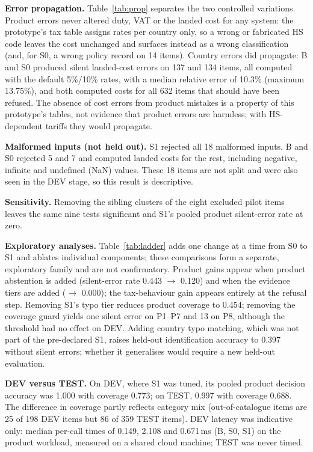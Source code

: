 \documentclass[conference]{IEEEtran}
\begin{document}
\textbf{Error propagation.} Table~\ref{tab:prop} separates the two controlled variations. Product errors never altered
duty, VAT or the landed cost for any system: the prototype's tax table assigns rates per country only, so a wrong or
fabricated HS code leaves the cost unchanged and surfaces instead as a wrong classification (and, for S0, a wrong
policy record on 14 items). Country errors did propagate: B and S0 produced silent landed-cost errors on 137 and 134
items, all computed with the default 5\%/10\% rates, with a median relative error of 10.3\% (maximum 13.75\%), and both
computed costs for all 632 items that should have been refused. The absence of cost errors from product mistakes is a
property of this prototype's tables, not evidence that product errors are harmless; with HS-dependent tariffs they
would propagate.



\textbf{Malformed inputs (not held out).} S1 rejected all 18 malformed inputs. B and S0 rejected 5 and 7 and computed
landed costs for the rest, including negative, infinite and undefined (NaN) values. These 18 items are not split and
were also seen in the DEV stage, so this result is descriptive.

\textbf{Sensitivity.} Removing the sibling clusters of the eight excluded pilot items leaves the same nine tests
significant and S1's pooled product silent-error rate at zero.

\textbf{Exploratory analyses.} Table~\ref{tab:ladder} adds one change at a time from S0 to S1 and ablates individual
components; these comparisons form a separate, exploratory family and are not confirmatory. Product gains appear when
product abstention is added (silent-error rate 0.443 $\rightarrow$ 0.120) and when the evidence tiers are added
($\rightarrow$ 0.000); the tax-behaviour gain appears entirely at the refusal step. Removing S1's typo tier reduces
product coverage to 0.454; removing the coverage guard yields one silent error on P1--P7 and 13 on P8, although the
threshold had no effect on DEV. Adding country typo matching, which was not part of the pre-declared S1, raises held-out
identification accuracy to 0.397 without silent errors; whether it generalises would require a new held-out evaluation.



\textbf{DEV versus TEST.} On DEV, where S1 was tuned, its pooled product decision accuracy was 1.000 with coverage
0.773; on TEST, 0.997 with coverage 0.688. The difference in coverage partly reflects category mix (out-of-catalogue
items are 25 of 198 DEV items but 86 of 359 TEST items). DEV latency was indicative only: median per-call times of 0.149,
2.108 and 0.671\,ms (B, S0, S1) on the product workload, measured on a shared cloud machine; TEST was never timed.
\end{document}
